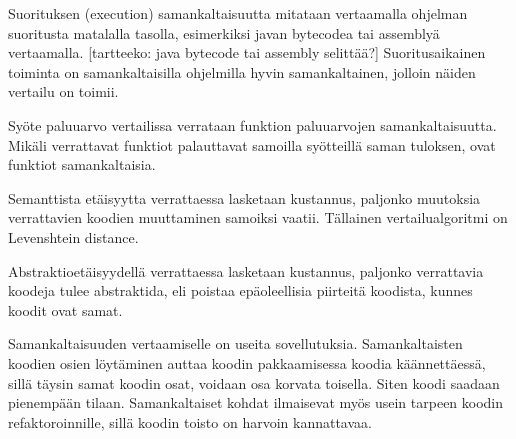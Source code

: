 \documentclass[finnish]{tktltiki2}
\theoremstyle{definition}
\theoremstyle{remark}
\begin{document}
\begin{itemize}
\begin{itemize}
Suorituksen (execution) samankaltaisuutta mitataan vertaamalla ohjelman suoritusta matalalla tasolla, esimerkiksi javan bytecodea tai assemblyä vertaamalla. [tartteeko: java bytecode tai assembly selittää?] Suoritusaikainen toiminta on samankaltaisilla ohjelmilla hyvin samankaltainen, jolloin näiden vertailu on toimii.
\end{itemize}
Syöte paluuarvo vertailissa verrataan funktion paluuarvojen samankaltaisuutta. Mikäli verrattavat funktiot palauttavat samoilla syötteillä saman tuloksen, ovat funktiot samankaltaisia.

Semanttista etäisyytta verrattaessa lasketaan kustannus, paljonko muutoksia verrattavien koodien muuttaminen samoiksi vaatii. Tällainen vertailualgoritmi on Levenshtein distance.

Abstraktioetäisyydellä verrattaessa lasketaan kustannus, paljonko verrattavia koodeja tulee abstraktida, eli poistaa epäoleellisia piirteitä koodista, kunnes koodit ovat samat.
\end{itemize}

Samankaltaisuuden vertaamiselle on useita sovellutuksia. Samankaltaisten koodien osien löytäminen auttaa koodin pakkaamisessa koodia käännettäessä, sillä täysin samat koodin osat, voidaan osa korvata toisella. Siten koodi saadaan pienempään tilaan. Samankaltaiset kohdat ilmaisevat myös usein tarpeen koodin refaktoroinnille, sillä koodin toisto on harvoin kannattavaa.





%
%
% 
%







% 
\end{document}
